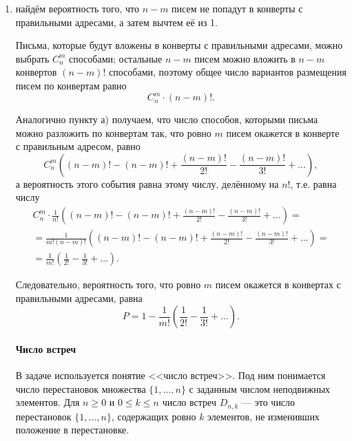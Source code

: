 \begin{enumerate}[label=\alph*)]
\item найдём вероятность того, что $n - m$ писем не попадут в конверты с правильными адресами, а затем вычтем её из 1.

Письма, которые будут вложены в конверты с правильными адресами,
можно выбрать $C_n^m$ способами;
остальные $n - m$ писем можно вложить в $n - m$ конвертов $ \left( n-m \right)!$ способами,
поэтому общее число вариантов размещения писем по конвертам равно $$C_n^m \cdot \left( n-m \right)!.$$

Аналогично пункту а) получаем, что число способов, которыми письма можно разложить по конвертам так, что ровно $m$ писем окажется в конверте с правильным адресом, равно
$$C_n^m
\left( \left( n-m \right)! - \left( n-m \right)! + \frac{ \left(n-m \right)!}{2!} - \frac{ \left( n-m\right)!}{3!} + \dotsc \right),$$
а вероятность этого события равна этому числу, делённому на $n!$, т.е. равна числу
\begin{equation*}
\begin{split}
C_n^m \cdot \frac{1}{n!}
\left( \left( n-m \right)! - \left( n-m \right)! + \frac{ \left(n-m \right)!}{2!} - \frac{ \left( n-m\right)!}{3!} + \dotsc \right) = \\
= \frac{1}{m! \left( n-m \right)!}
\left( \left( n-m \right)! - \left( n-m \right)! + \frac{ \left(n-m \right)!}{2!} - \frac{ \left( n-m\right)!}{3!} + \dotsc \right) = \\
= \frac{1}{m!} \left( \frac{1}{2!} - \frac{1}{3!} + \dotsc \right).
\end{split}
\end{equation*}

Следовательно, вероятность того, что ровно $m$ писем окажется в конвертах с правильными адресами, равна
$$P =
1 - \frac{1}{m!} \left( \frac{1}{2!} - \frac{1}{3!} + \dotsc \right).$$

\paragraph*{Число встреч}

В задаче используется понятие <<число встреч>>.
Под ним понимается число перестановок множества $\{ 1, \dotsc, n \}$ с заданным числом неподвижных элементов.
Для $n \geq 0$ и $0 \leq k \leq n$ число встреч $D_{n, k}$ --- это число перестановок $\{ 1, \dotsc, n \}$,
содержащих ровно $k$ элементов, не изменивших положение в перестановке.


\end{enumerate}
